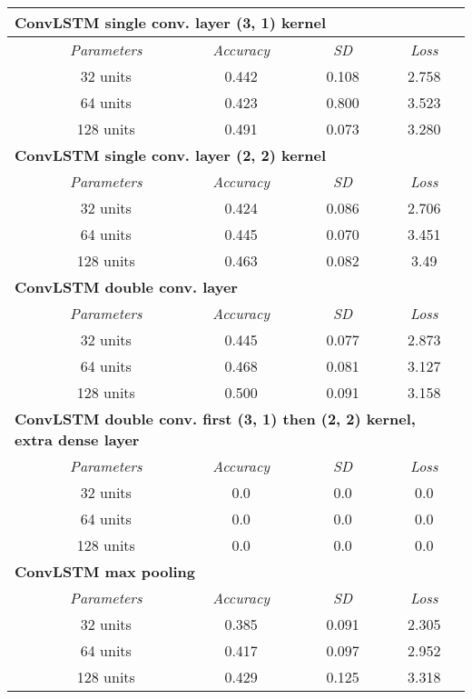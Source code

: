 \begin{table}[htbp]
\begin{tabular}{|cc|c|c|c|}
    \multicolumn{5}{|l|}{\textbf{ConvLSTM single conv. layer (3, 1) kernel}}\\
    \hline
     {} & {\textit{Parameters}} & {\textit{Accuracy}} & {\textit{SD}} & {\textit{Loss}}\\
    \hline
     & 32 units & 0.442 & 0.108 & 2.758 \\
     & 64 units & 0.423 & 0.800 & 3.523 \\
     & 128 units & 0.491 & 0.073 & 3.280 \\
    \hline
    \multicolumn{5}{|l|}{\textbf{ConvLSTM single conv. layer (2, 2) kernel}}\\
    \hline
     {} & {\textit{Parameters}} & {\textit{Accuracy}} & {\textit{SD}} & {\textit{Loss}}\\
    \hline
     & 32 units & 0.424 & 0.086 & 2.706 \\
     & 64 units & 0.445 & 0.070 & 3.451\\
     & 128 units & 0.463 & 0.082 & 3.49\\
    \hline
    \multicolumn{5}{|l|}{\textbf{ConvLSTM double conv. layer}}\\
    \hline
     {} & {\textit{Parameters}} & {\textit{Accuracy}} & {\textit{SD}} & {\textit{Loss}}\\
    \hline
     & 32 units & 0.445 & 0.077 & 2.873\\
     & 64 units & 0.468 & 0.081 & 3.127\\
     & 128 units & 0.500 & 0.091 & 3.158\\
    \hline
    
    \multicolumn{5}{|l|}{\textbf{ConvLSTM double conv. first (3, 1) then (2, 2) kernel, extra dense layer}}\\
    \hline
     {} & {\textit{Parameters}} & {\textit{Accuracy}} & {\textit{SD}} & {\textit{Loss}}\\
    \hline
     & 32 units & 0.0 & 0.0 & 0.0 \\
     & 64 units & 0.0 & 0.0 & 0.0 \\
     & 128 units & 0.0 & 0.0 & 0.0 \\
    \hline
    
    \multicolumn{5}{|l|}{\textbf{ConvLSTM max pooling}}\\
    \hline
     {} & {\textit{Parameters}} & {\textit{Accuracy}} & {\textit{SD}} & {\textit{Loss}}\\
    \hline
     & 32 units & 0.385 & 0.091 & 2.305\\
     & 64 units & 0.417 & 0.097 & 2.952\\
     & 128 units & 0.429 & 0.125 & 3.318\\
    \hline
  \end{tabular}
\end{table}
